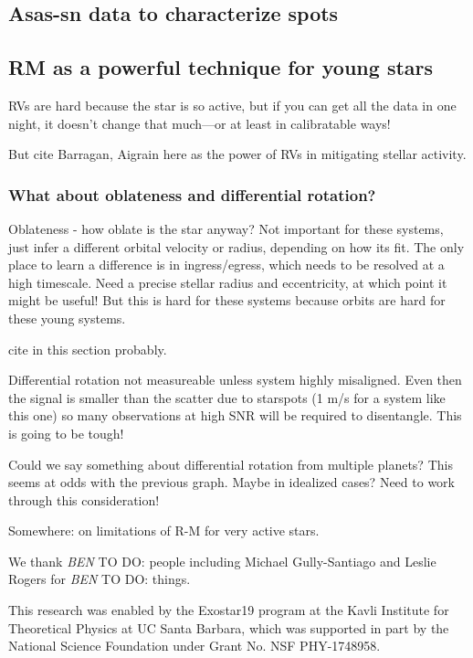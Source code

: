 \documentclass[twocolumn]{aastex62}
\newcommand{\todo}[3]{{\color{#2} \emph{#1} TO DO: #3}}
\newcommand{\btmtodo}[1]{\todo{BEN}{blue}{#1}}
\begin{document}
\subsection{Asas-sn data to characterize spots}

\subsection{RM as a powerful technique for young stars}

RVs are hard because the star is so active, but if you can get all the data in one night, it doesn't change that much---or at least in calibratable ways!


But cite Barragan, Aigrain here as the power of RVs in mitigating stellar activity.

\subsubsection{What about oblateness and differential rotation?}

Oblateness - how oblate is the star anyway?
Not important for these systems, just infer a different orbital velocity or radius, depending on how its fit. The only place to learn a difference is in ingress/egress, which needs to be resolved at a high timescale. Need a precise stellar radius and eccentricity, at which point it might be useful! But this is hard for these systems because orbits are hard for these young systems.

cite \citet{Giminez06} in this section probably.


Differential rotation not measureable unless system highly misaligned. Even then the signal is smaller than the scatter due to starspots (1 m/s for a system like this one) so many observations at high SNR will be required to disentangle. This is going to be tough!

Could we say something about differential rotation from multiple planets? This seems at odds with the previous graph. Maybe in idealized cases? Need to work through this consideration!


Somewhere: \citet{Oshagh18} on limitations of R-M for very active stars.

\acknowledgements

We thank \btmtodo{people including Michael Gully-Santiago and Leslie Rogers} for \btmtodo{things}.


This research was enabled by the Exostar19 program at the Kavli Institute for Theoretical Physics at UC Santa Barbara, which was supported in part by the National Science Foundation under Grant No. NSF PHY-1748958.
\end{document}
